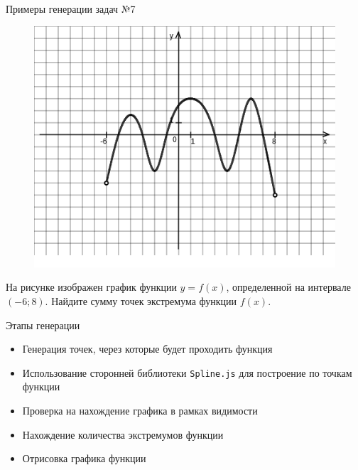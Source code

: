 \documentclass[aspectratio=169]{beamer}
\begin{document}
\begin{frame}{Примеры генерации задач №7}
    \vspace{-0.5cm}
    \begin{figure}[t]
        \includegraphics[scale=0.38]{images/020693809529216n0}
    \end{figure}
    На рисунке изображен график функции $y=f(x)$, определенной на интервале $(-6;8)$. Найдите сумму точек экстремума функции $f(x)$.
\end{frame}

\begin{frame}{Этапы генерации}
    \begin{itemize}
        \item Генерация точек, через которые будет проходить функция
        \item Использование сторонней библиотеки \texttt{Spline.js} для построение по точкам функции
        \item Проверка на нахождение графика в рамках видимости %
        \item Нахождение количества экстремумов функции
        \item Отрисовка графика функции
    \end{itemize}
    
\end{frame}
\end{document}
